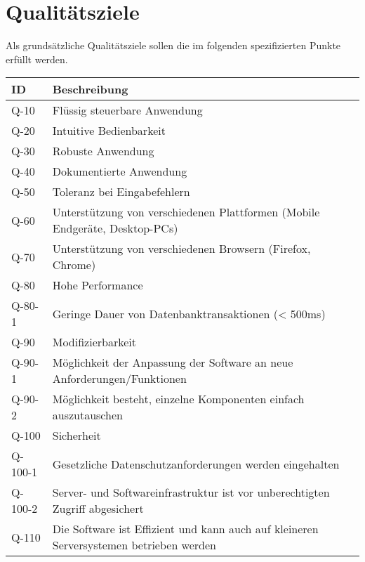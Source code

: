 
\chapter{Qualitätsziele}
Als grundsätzliche Qualitätsziele sollen die im folgenden spezifizierten Punkte erfüllt werden.

\begin{tabularx}{\textwidth}{|l|X|l|}
\toprule
\textbf{ID} & \textbf{Beschreibung}\\
\endhead
\hline
Q-10 & Flüssig steuerbare Anwendung  \\
Q-20 & Intuitive Bedienbarkeit  \\
Q-30 & Robuste Anwendung  \\
Q-40 & Dokumentierte Anwendung  \\  
Q-50 & Toleranz bei Eingabefehlern \\
Q-60 & Unterstützung von verschiedenen Plattformen (Mobile Endgeräte, Desktop-PCs) \\
Q-70 & Unterstützung von verschiedenen Browsern (Firefox, Chrome) \\
Q-80 & Hohe Performance \\
Q-80-1 & Geringe Dauer von Datenbanktransaktionen (< 500ms)\\
Q-90 & Modifizierbarkeit \\
Q-90-1 & Möglichkeit der Anpassung der Software an neue Anforderungen/Funktionen\\
Q-90-2 & Möglichkeit besteht, einzelne Komponenten einfach auszutauschen\\
Q-100 & Sicherheit \\
Q-100-1 & Gesetzliche Datenschutzanforderungen werden eingehalten \\
Q-100-2 & Server- und Softwareinfrastruktur ist vor unberechtigten Zugriff abgesichert \\
Q-110 & Die Software ist Effizient und kann auch auf kleineren Serversystemen betrieben werden \\
\hline
\end{tabularx}